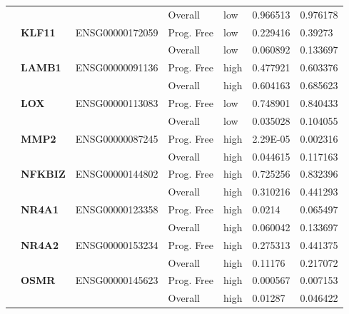 \begin{spacing}{1}
{\begin{longtable}{%
            |>{\bfseries}p{2cm}|
            >{\bfseries}p{1.9cm}|
            >{\tiny}p{1.9cm}|
            p{2cm}|
            p{2cm}|
            p{1.5cm}|
            p{1.5cm}|
            }
            \hhline{~~~----}
             &          &                 & Overall    & low  & 0.966513 & 0.976178 \\
            \hhline{~======}
             & KLF11    & ENSG00000172059 & Prog. Free & low  & 0.229416 & 0.39273  \\
            \hhline{~~~----}
             &          &                 & Overall    & low  & 0.060892 & 0.133697 \\
            \hhline{~======}
             & LAMB1    & ENSG00000091136 & Prog. Free & high & 0.477921 & 0.603376 \\
            \hhline{~~~----}
             &          &                 & Overall    & high & 0.604163 & 0.685623 \\
            \hhline{~======}
             & LOX      & ENSG00000113083 & Prog. Free & low  & 0.748901 & 0.840433 \\
            \hhline{~~~----}
             &          &                 & Overall    & low  & 0.035028 & 0.104055 \\
            \hhline{~======}
             & MMP2     & ENSG00000087245 & Prog. Free & high & 2.29E-05 & 0.002316 \\
            \hhline{~~~----}
             &          &                 & Overall    & high & 0.044615 & 0.117163 \\
            \hhline{~======}
             & NFKBIZ   & ENSG00000144802 & Prog. Free & high & 0.725256 & 0.832396 \\
            \hhline{~~~----}
             &          &                 & Overall    & high & 0.310216 & 0.441293 \\
            \hhline{~======}
             & NR4A1    & ENSG00000123358 & Prog. Free & high & 0.0214   & 0.065497 \\
            \hhline{~~~----}
             &          &                 & Overall    & high & 0.060042 & 0.133697 \\
            \hhline{~======}
             & NR4A2    & ENSG00000153234 & Prog. Free & high & 0.275313 & 0.441375 \\
            \hhline{~~~----}
             &          &                 & Overall    & high & 0.11176  & 0.217072 \\
            \hhline{~======}
             & OSMR     & ENSG00000145623 & Prog. Free & high & 0.000567 & 0.007153 \\
            \hhline{~~~----}
             &          &                 & Overall    & high & 0.01287  & 0.046422 \\

\end{longtable}}
\end{spacing}
